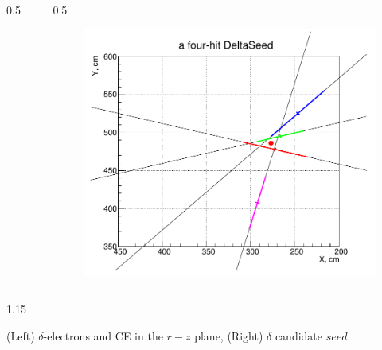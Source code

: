 \documentclass{beamer}
\begin{document}
\begin{frame}
\begin{columns}
\begin{column}{0.5\framewidth}
\begin{figure}[!h]
       \label{fig:momhits}
\end{figure}
        \end{column}
        \begin{column}{0.5\framewidth}
               \begin{figure}[!h]
        \centering
         \hspace*{-1em}
        \includegraphics[width =0.75\columnwidth]{figures/png/Screenshot_20240811_115854.png}
       \label{fig:momhits}
\end{figure}
        \end{column}
    \end{columns}
        \vspace{-2mm}
      \begin{columns}
        \begin{column}{1.15\framewidth}
    \setlength{\leftmargini}{1.2em}
    \begin{itemize}
    {\footnotesize   
    \item (Left) $\delta$-electrons and CE in the $r-z$ plane, (Right) $\delta$ candidate $seed$.}
    \end{itemize}
    \end{column}
    \end{columns}
\end{frame}
\end{document}
